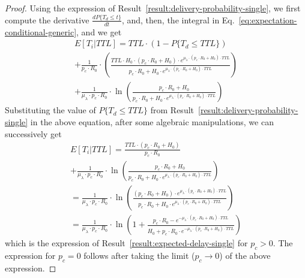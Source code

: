 \documentclass[10pt,conference,letterpaper]{IEEEtran}
\newcommand{\eq}[1]{Eq.~\eqref{#1}}
\begin{document}
\begin{proof}
Using the expression of Result~\ref{result:delivery-probability-single}, we first compute the derivative $\frac{dP\{T_{d}\leq t\}}{dt}$, and, then, the integral in \eq{eq:expectation-conditional-generic}, and we get
\begin{multline*}
E[T_{i}|TTL] 
= 	TTL\cdot (1-P\{T_{d}\leq TTL\}) \\
	+ \frac{1}{p_{c}\cdot R_{0}}\cdot 
\left(\frac{TTL\cdot H_{0}\cdot (p_{c}\cdot R_{0}+H_{0})\cdot e^{\mu_{\lambda}\cdot(p_{c}\cdot R_{0}+H_{0})\cdot TTL }}{p_{c}\cdot R_{0}+H_{0}\cdot e^{\mu_{\lambda}\cdot(p_{c}\cdot R_{0}+H_{0})\cdot TTL }} \right) 	\\
	+ \frac{1}{\mu_{\lambda}\cdot p_{c}\cdot R_{0}}\cdot \ln\left(\frac{p_{c}\cdot R_{0}+H_{0}}{p_{c}\cdot R_{0}+H_{0}\cdot e^{\mu_{\lambda}\cdot(p_{c}\cdot R_{0}+H_{0})\cdot TTL }}\right)
\end{multline*}
Substituting the value of $P\{T_{d}\leq TTL\}$ from Result~\ref{result:delivery-probability-single} in the above equation, after some algebraic manipulations, we can successively get
\begin{multline*}
E[T_{i}|TTL] 
= 	\frac{TTL\cdot (p_{c}\cdot R_{0}+H_{0})}{p_{c}\cdot R_{0}}  	\\
	+ \frac{1}{\mu_{\lambda}\cdot p_{c}\cdot R_{0}}\cdot \ln\left(\frac{p_{c}\cdot R_{0}+H_{0}}{p_{c}\cdot R_{0}+H_{0}\cdot e^{\mu_{\lambda}\cdot(p_{c}\cdot R_{0}+H_{0})\cdot TTL }}\right)\\
	=\frac{1}{\mu_{\lambda}\cdot p_{c}\cdot R_{0}}\cdot \ln\left(\frac{(p_{c}\cdot R_{0}+H_{0})\cdot e^{\mu_{\lambda}\cdot(p_{c}\cdot R_{0}+H_{0})\cdot TTL }}{p_{c}\cdot R_{0}+H_{0}\cdot e^{\mu_{\lambda}\cdot(p_{c}\cdot R_{0}+H_{0})\cdot TTL }}\right)\\
=\frac{1}{\mu_{\lambda}\cdot p_{c}\cdot R_{0}}\cdot \ln\left(1+\frac{p_{c}\cdot R_{0}- e^{-\mu_{\lambda}\cdot(p_{c}\cdot R_{0}+H_{0})\cdot TTL }}{H_{0}+p_{c}\cdot R_{0}\cdot e^{-\mu_{\lambda}\cdot(p_{c}\cdot R_{0}+H_{0})\cdot TTL }}\right)
\end{multline*}
which is the expression of Result~\ref{result:expected-delay-single} for $p_{c}>0$. The expression for $p_{c}=0$ follows after taking the limit ($p_{c}\rightarrow0$) of the above expression.
\end{proof}
\end{document}
